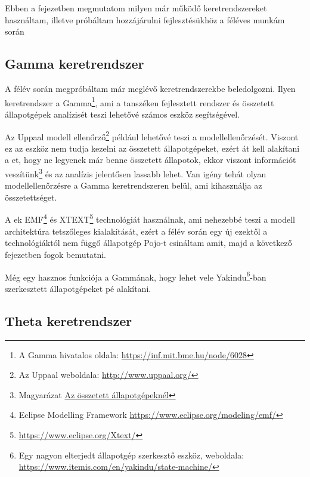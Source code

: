 \chapter{\architecture}
\label{sec:archiutecture}

Ebben a fejezetben megmutatom milyen már működő keretrendszereket használtam, illetve próbáltam hozzájárulni fejlesztésükhöz a féléves munkám során

\section{Gamma keretrendszer}
A félév során megpróbáltam már meglévő keretrendszerekbe beledolgozni. Ilyen keretrendszer a Gamma\footnote{A Gamma hivatalos oldala: \url{https://inf.mit.bme.hu/node/6028}}, ami a tanszéken fejlesztett rendszer és összetett állapotgépek analízisét teszi lehetővé számos eszköz segítségével.

Az Uppaal modell ellenőrző\footnote{Az Uppaal weboldala: \url{http://www.uppaal.org/}} például lehetővé teszi a {\gammaSc} modellellenőrzését. Viszont ez az eszköz nem tudja kezelni az összetett állapotgépeket, ezért át kell alakítani a {\gammaSc}et, hogy ne legyenek már benne összetett állapotok, ekkor viszont információt veszítünk\footnote{Magyarázat \hyperref[infovesztes]{Az összetett állapotgépeknél}} és az analízis jelentősen lassabb lehet. Van igény tehát olyan modellellenőrzésre a Gamma keretrendszeren belül, ami kihasználja az összetettséget.

A {\gammaSc}ek EMF\footnote{Eclipse Modelling Framework \url{https://www.eclipse.org/modeling/emf/}} és XTEXT\footnote{\url{https://www.eclipse.org/Xtext/}} technológiát használnak, ami nehezebbé teszi a modell architektúra tetszőleges kialakítását, ezért a félév során egy új ezektől a technológiáktól nem függő állapotgép Pojo-t csináltam amit, majd a következő fejezetben fogok bemutatni.

Még egy hasznos funkciója a Gammának, hogy lehet vele Yakindu\footnote{Egy nagyon elterjedt állapotgép szerkesztő eszköz, weboldala: \url{https://www.itemis.com/en/yakindu/state-machine/}}-ban szerkesztett állapotgépeket {\gammaSc}pé alakítani.


\section{Theta keretrendszer}

